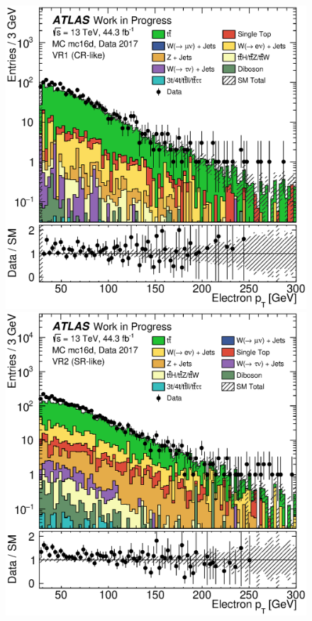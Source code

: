\clearpage{}
\begin{figure}[th!]
    \centering
    \setlength{\individualPlotWidth}{0.434\fulllinewidth}
    \includegraphics[width=\individualPlotWidth]{Assets/Plots/VR1/h_stack_mc16d_data17_el_pt.eps}
    \hspace{1em}
    \includegraphics[width=\individualPlotWidth]{Assets/Plots/VR2/h_stack_mc16d_data17_el_pt.eps}


\end{figure}
